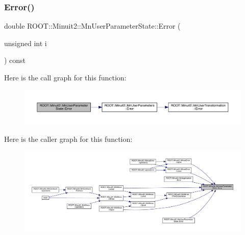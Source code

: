 \mbox{\label{classROOT_1_1Minuit2_1_1MnUserParameterState_a16a0c68e252a3fbc3ceb0f41934e376e}} 
\subsubsection{\texorpdfstring{Error()}{Error()}\hspace{0.1cm}{\footnotesize\ttfamily [3/6]}}
{\footnotesize\ttfamily double R\+O\+O\+T\+::\+Minuit2\+::\+Mn\+User\+Parameter\+State\+::\+Error (\begin{DoxyParamCaption}\item[{unsigned int}]{i }\end{DoxyParamCaption}) const}

Here is the call graph for this function\+:
\nopagebreak
\begin{figure}[H]
\begin{center}
\leavevmode
\includegraphics[width=350pt]{d3/de0/classROOT_1_1Minuit2_1_1MnUserParameterState_a16a0c68e252a3fbc3ceb0f41934e376e_cgraph}
\end{center}
\end{figure}
Here is the caller graph for this function\+:
\nopagebreak
\begin{figure}[H]
\begin{center}
\leavevmode
\includegraphics[width=350pt]{d3/de0/classROOT_1_1Minuit2_1_1MnUserParameterState_a16a0c68e252a3fbc3ceb0f41934e376e_icgraph}
\end{center}
\end{figure}
\mbox{\label{classROOT_1_1Minuit2_1_1MnUserParameterState_a74ae393362454df2808936090391560f}} 
